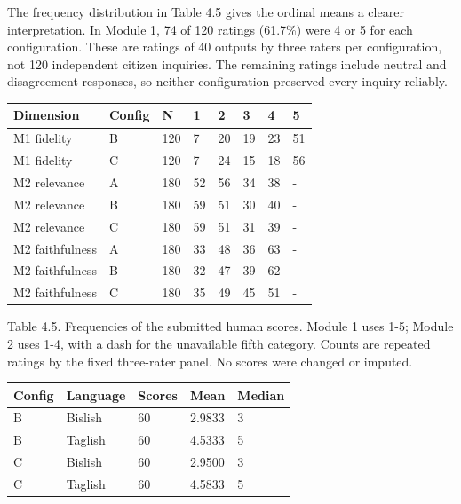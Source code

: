The frequency distribution in Table 4.5 gives the ordinal means a clearer interpretation. In Module 1, 74 of 120 ratings (61.7\%) were 4 or 5 for each configuration. These are ratings of 40 outputs by three raters per configuration, not 120 independent citizen inquiries. The remaining ratings include neutral and disagreement responses, so neither configuration preserved every inquiry reliably.


{\small\begin{longtable}{@{}p{0.672in}p{0.672in}p{0.672in}p{0.672in}p{0.672in}p{0.672in}p{0.672in}p{0.672in}@{}}\toprule

Dimension & Config & N & 1 & 2 & 3 & 4 & 5 \\ \midrule\endhead

M1 fidelity & B & 120 & 7 & 20 & 19 & 23 & 51 \\

M1 fidelity & C & 120 & 7 & 24 & 15 & 18 & 56 \\

M2 relevance & A & 180 & 52 & 56 & 34 & 38 & - \\

M2 relevance & B & 180 & 59 & 51 & 30 & 40 & - \\

M2 relevance & C & 180 & 59 & 51 & 31 & 39 & - \\

M2 faithfulness & A & 180 & 33 & 48 & 36 & 63 & - \\

M2 faithfulness & B & 180 & 32 & 47 & 39 & 62 & - \\

M2 faithfulness & C & 180 & 35 & 49 & 45 & 51 & - \\

\bottomrule\end{longtable}}

Table 4.5. Frequencies of the submitted human scores. Module 1 uses 1-5; Module 2 uses 1-4, with a dash for the unavailable fifth category. Counts are repeated ratings by the fixed three-rater panel. No scores were changed or imputed.


{\small\begin{longtable}{@{}p{1.172in}p{1.172in}p{1.172in}p{1.172in}p{1.172in}@{}}\toprule

Config & Language & Scores & Mean & Median \\ \midrule\endhead

B & Bislish & 60 & 2.9833 & 3 \\

B & Taglish & 60 & 4.5333 & 5 \\

C & Bislish & 60 & 2.9500 & 3 \\

C & Taglish & 60 & 4.5833 & 5 \\

\bottomrule\end{longtable}}

